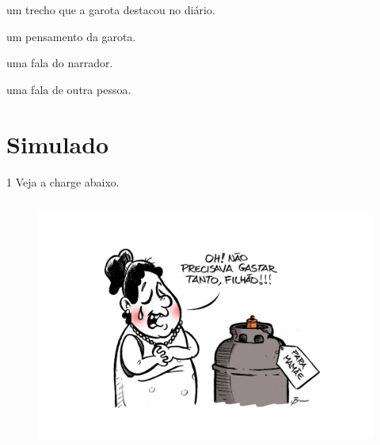 \begin{escolha}
\item um trecho que a garota destacou no diário.
\item um pensamento da garota.
\item uma fala do narrador.
\item uma fala de outra pessoa.
\end{escolha}



\chapter[Simulado 3]{Simulado}

\num{1} Veja a charge abaixo.

\begin{figure}[H]
\centering\includegraphics[width=4.86098in,height=3.28333in]{./imgSAEB_6_POR/media/image39.png}
\end{figure}


